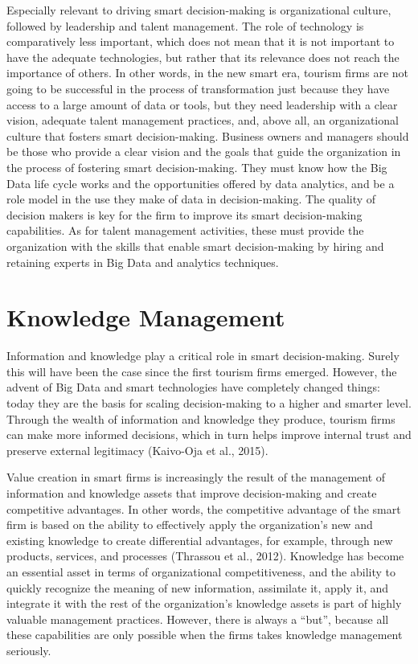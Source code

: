 \documentclass[
  letterpaper,
  DIV=11,
  numbers=noendperiod]{scrreprt}
\begin{document}
Especially relevant to driving smart decision-making is organizational
culture, followed by leadership and talent management. The role of
technology is comparatively less important, which does not mean that it
is not important to have the adequate technologies, but rather that its
relevance does not reach the importance of others. In other words, in
the new smart era, tourism firms are not going to be successful in the
process of transformation just because they have access to a large
amount of data or tools, but they need leadership with a clear vision,
adequate talent management practices, and, above all, an organizational
culture that fosters smart decision-making. Business owners and managers
should be those who provide a clear vision and the goals that guide the
organization in the process of fostering smart decision-making. They
must know how the Big Data life cycle works and the opportunities
offered by data analytics, and be a role model in the use they make of
data in decision-making. The quality of decision makers is key for the
firm to improve its smart decision-making capabilities. As for talent
management activities, these must provide the organization with the
skills that enable smart decision-making by hiring and retaining experts
in Big Data and analytics techniques.

\hypertarget{knowledge-management}{%
\section{Knowledge Management}\label{knowledge-management}}

Information and knowledge play a critical role in smart decision-making.
Surely this will have been the case since the first tourism firms
emerged. However, the advent of Big Data and smart technologies have
completely changed things: today they are the basis for scaling
decision-making to a higher and smarter level. Through the wealth of
information and knowledge they produce, tourism firms can make more
informed decisions, which in turn helps improve internal trust and
preserve external legitimacy (Kaivo-Oja et al., 2015).

Value creation in smart firms is increasingly the result of the
management of information and knowledge assets that improve
decision-making and create competitive advantages. In other words, the
competitive advantage of the smart firm is based on the ability to
effectively apply the organization's new and existing knowledge to
create differential advantages, for example, through new products,
services, and processes (Thrassou et al., 2012). Knowledge has become an
essential asset in terms of organizational competitiveness, and the
ability to quickly recognize the meaning of new information, assimilate
it, apply it, and integrate it with the rest of the organization's
knowledge assets is part of highly valuable management practices.
However, there is always a ``but'', because all these capabilities are
only possible when the firms takes knowledge management seriously.
\end{document}
